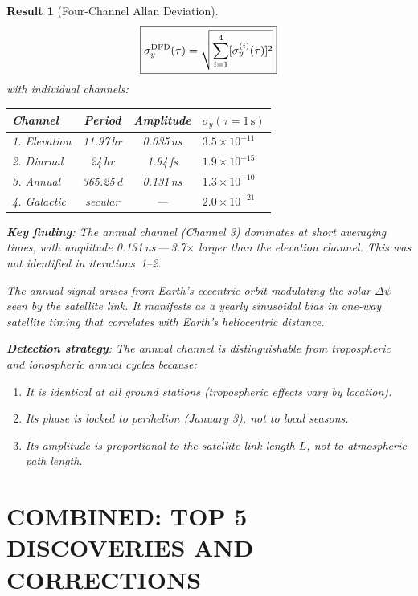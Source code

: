 \documentclass[aps,prd,twocolumn,superscriptaddress]{revtex4-2}
\newtheorem{result}{Result}
\begin{document}
\begin{result}[Four-Channel Allan Deviation]
\label{res:Allan-channels}
\begin{equation}
\boxed{
\sigma_y^{\rm DFD}(\tau) = \sqrt{\sum_{i=1}^{4}[\sigma_y^{(i)}(\tau)]^2}
}
\end{equation}
with individual channels:
\begin{center}
\begin{tabular}{lccl}
\toprule
Channel & Period & Amplitude & $\sigma_y(\tau=1\,\text{s})$ \\
\midrule
1. Elevation & 11.97\,hr & 0.035\,ns & $3.5\times10^{-11}$ \\
2. Diurnal & 24\,hr & 1.94\,fs & $1.9\times10^{-15}$ \\
3. Annual & 365.25\,d & 0.131\,ns & $1.3\times10^{-10}$ \\
4. Galactic & secular & --- & $2.0\times10^{-21}$ \\
\bottomrule
\end{tabular}
\end{center}

\textbf{Key finding}: The \emph{annual channel} (Channel 3) dominates
at short averaging times, with amplitude 0.131\,ns\,---\,3.7$\times$
larger than the elevation channel. This was not identified in
iterations~1--2.

The annual signal arises from Earth's eccentric orbit modulating
the solar $\Delta\psi$ seen by the satellite link.  It manifests
as a yearly sinusoidal bias in one-way satellite timing that
correlates with Earth's heliocentric distance.

\textbf{Detection strategy}: The annual channel is distinguishable
from tropospheric and ionospheric annual cycles because:
\begin{enumerate}
\item It is \emph{identical} at all ground stations (tropospheric
effects vary by location).
\item Its phase is locked to perihelion (January 3), not to
local seasons.
\item Its amplitude is proportional to the satellite link length
$L$, not to atmospheric path length.
\end{enumerate}
\end{result}


\part*{COMBINED: TOP 5 DISCOVERIES AND CORRECTIONS}
\end{document}
